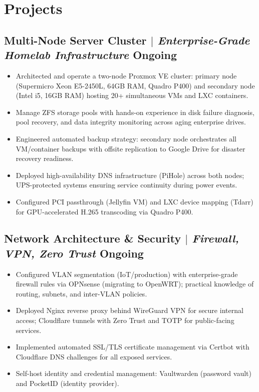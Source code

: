 \documentclass[10pt]{article}
\begin{document}
\section{Projects}
\subsection{Multi-Node Server Cluster $|$ \normalfont\textit{Enterprise-Grade Homelab Infrastructure} \hfill Ongoing}
\begin{itemize}
	\item Architected and operate a two-node Proxmox VE cluster: primary node (Supermicro Xeon E5-2450L, 64GB RAM, Quadro P400) and secondary node (Intel i5, 16GB RAM) hosting 20+ simultaneous VMs and LXC containers.
	\item Manage ZFS storage pools with hands-on experience in disk failure diagnosis, pool recovery, and data integrity monitoring across aging enterprise drives.
	\item Engineered automated backup strategy: secondary node orchestrates all VM/container backups with offsite replication to Google Drive for disaster recovery readiness.
	\item Deployed high-availability DNS infrastructure (PiHole) across both nodes; UPS-protected systems ensuring service continuity during power events.
	\item Configured PCI passthrough (Jellyfin VM) and LXC device mapping (Tdarr) for GPU-accelerated H.265 transcoding via Quadro P400.
\end{itemize}

\subsection{Network Architecture \& Security $|$ \normalfont\textit{Firewall, VPN, Zero Trust} \hfill Ongoing}
\begin{itemize}
	\item Configured VLAN segmentation (IoT/production) with enterprise-grade firewall rules via OPNsense (migrating to OpenWRT); practical knowledge of routing, subnets, and inter-VLAN policies.
	\item Deployed Nginx reverse proxy behind WireGuard VPN for secure internal access; Cloudflare tunnels with Zero Trust and TOTP for public-facing services.
	\item Implemented automated SSL/TLS certificate management via Certbot with Cloudflare DNS challenges for all exposed services.
	\item Self-host identity and credential management: Vaultwarden (password vault) and PocketID (identity provider).
\end{itemize}
\end{document}
